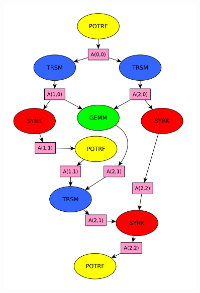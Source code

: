 \documentclass[xcolor={usenames,dvipsnames,svgnames,table}, aspectratio=43]{beamer}
\begin{document}
\begin{frame}[fragile]
\begin{minipage}[t]{0.46\linewidth}
\begin{figure}
{    \includegraphics[width=0.9\textwidth]{graph/cholesky-dag-3-data.pdf}%
  }%
\end{figure}
\end{minipage}


\end{frame}
\end{document}
